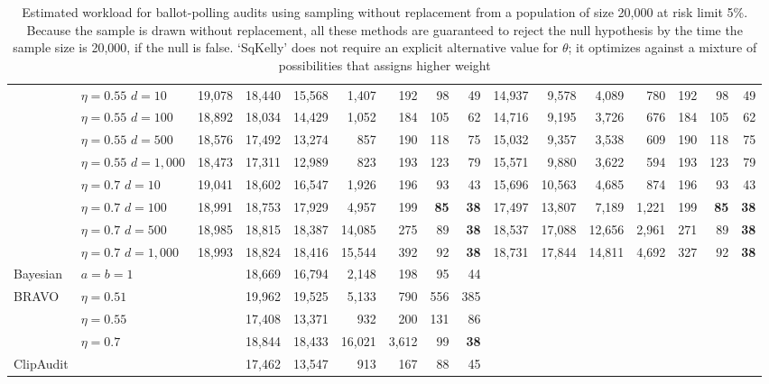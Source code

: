 \documentclass[aoas]{imsart}
\begin{document}
\begin{table}
\begin{tabular}{ll|rrrrrrr|rrrrrrr}
 & $\eta=0.55$ $d=10$ & 19,078  & 18,440  & 15,568  & 1,407  & 192  & 98  & 49  & 14,937  & 9,578  & 4,089  & 780  & 192  & 98  & 49  \\ 
 & $\eta=0.55$ $d=100$ & 18,892  & 18,034  & 14,429  & 1,052  & 184  & 105  & 62  & 14,716  & 9,195  & 3,726  & 676  & 184  & 105  & 62  \\ 
 & $\eta=0.55$ $d=500$ & 18,576  & 17,492  & 13,274  & 857  & 190  & 118  & 75  & 15,032  & 9,357  & 3,538  & 609  & 190  & 118  & 75  \\ 
 & $\eta=0.55$ $d=1{,}000$ & 18,473  & 17,311  & 12,989  & 823  & 193  & 123  & 79  & 15,571  & 9,880  & 3,622  & 594  & 193  & 123  & 79  \\ 
 & $\eta=0.7$ $d=10$ & 19,041  & 18,602  & 16,547  & 1,926  & 196  & 93  & 43  & 15,696  & 10,563  & 4,685  & 874  & 196  & 93  & 43  \\ 
 & $\eta=0.7$ $d=100$ & 18,991  & 18,753  & 17,929  & 4,957  & 199  & \bf{85}  & \bf{38}  & 17,497  & 13,807  & 7,189  & 1,221  & 199  & \bf{85}  & \bf{38}  \\ 
 & $\eta=0.7$ $d=500$ & 18,985  & 18,815  & 18,387  & 14,085  & 275  & 89  & \bf{38}  & 18,537  & 17,088  & 12,656  & 2,961  & 271  & 89  & \bf{38}  \\ 
 & $\eta=0.7$ $d=1{,}000$ & 18,993  & 18,824  & 18,416  & 15,544  & 392  & 92  & \bf{38}  & 18,731  & 17,844  & 14,811  & 4,692  & 327  & 92  & \bf{38}  \\ 
\hline
Bayesian & $a=b=1$ & & 18,669 & 16,794  & 2,148  & 198  & 95  & 44  \\
\hline
BRAVO & $\eta=0.51$ &&19,962 & 19,525  & 5,133  & 790  & 556  & 385  \\
             & $\eta=0.55$ && 17,408 & 13,371  & 932  & 200  & 131  & 86  \\
             & $\eta=0.7$   && 18,844& 18,433  & 16,021  & 3,612  & 99  & \bf{38}  \\
\hline
ClipAudit &      && 17,462 & 13,547  & 913  & 167  & 88  & 45  \\
\hline
\end{tabular} 
\caption{\protect \label{tab:finite-population}
Estimated workload for ballot-polling audits using sampling without replacement from a population of 
size 20,000 at risk limit 5\%.
Because the sample is drawn without replacement, all these methods are guaranteed to reject the null hypothesis by the time
the sample size is 20,000, if the null is false.
`SqKelly' does not require an explicit alternative value for $\theta$; it optimizes against a mixture of possibilities that assigns higher weight
}
\end{table}
\end{document}
